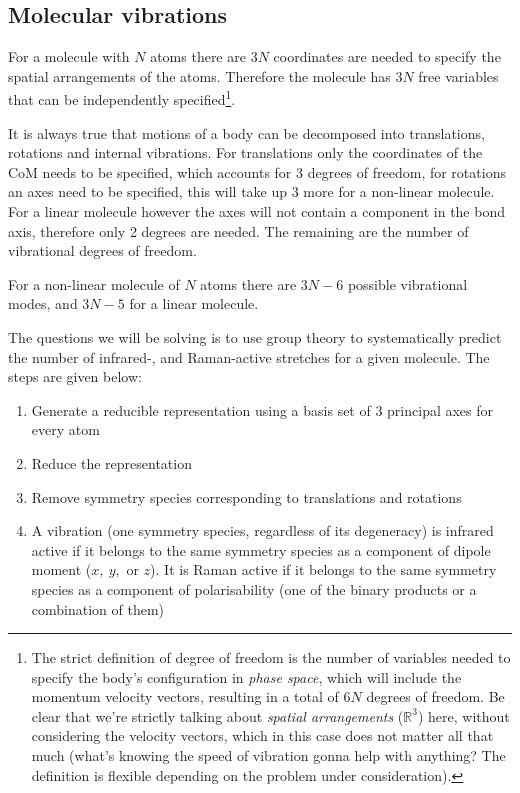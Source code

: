 \subsection{Molecular vibrations}
For a molecule with $N$ atoms there are $3N$ coordinates are needed to specify the spatial arrangements of the atoms. Therefore the molecule has $3N$ free variables that can be independently specified\footnote{The strict definition of degree of freedom is the number of variables needed to specify the body's configuration in \emph{phase space}, which will include the momentum \ie velocity vectors, resulting in a total of $6N$ degrees of freedom. Be clear that we're strictly talking about \emph{spatial arrangements} ($\mathbb{R}^3$) here, without considering the velocity vectors, which in this case does not matter all that much (what's knowing the speed of vibration gonna help with anything? The definition is flexible depending on the problem under consideration).}.\par
It is always true that motions of a body can be decomposed into translations, rotations and internal vibrations. For translations only the coordinates of the CoM needs to be specified, which accounts for 3 degrees of freedom, for rotations an axes need to be specified, this will take up 3 more for a non-linear molecule. For a linear molecule however the axes will not contain a component in the bond axis, therefore only 2 degrees are needed. The remaining are the number of vibrational degrees of freedom. 
\begin{thrm}
For a non-linear molecule of $N$ atoms there are $3N-6$ possible vibrational modes, and $3N-5$ for a linear molecule.
\end{thrm}
The questions we will be solving is to use group theory to systematically predict the number of infrared-, and Raman-active stretches for a given molecule. The steps are given below:
\begin{enumerate}
	\item Generate a reducible representation using a basis set of 3 principal axes for every atom
	\item Reduce the representation
	\item Remove symmetry species corresponding to translations and rotations
	\item A vibration (one symmetry species, regardless of its degeneracy) is infrared active if it belongs to the same symmetry species as a component of dipole moment ($x,\ y,$ or $z$). It is Raman active if it belongs to the same symmetry species as a component of polarisability (one of the binary products or a combination of them)
\end{enumerate}
